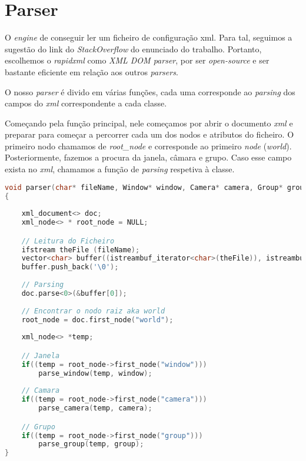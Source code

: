 \documentclass[14pt, a4 paper]{report}
\begin{document}
\section{Parser}
O \textit{engine} de conseguir ler um ficheiro de configuração xml. Para tal, seguimos a sugestão do link do \textit{StackOverflow} do enunciado do trabalho. Portanto, escolhemos o \textit{rapidxml} como \textit{XML DOM parser}, por ser \textit{open-source} e ser bastante eficiente em relação aos outros \textit{parsers}.

O nosso \textit{parser} é divido em várias funções, cada uma corresponde ao \textit{parsing} dos campos do \textit{xml} correspondente a cada classe.

Começando pela função principal, nele começamos por abrir o documento \textit{xml} e preparar para começar a percorrer cada um dos nodos e atributos do ficheiro. O primeiro nodo chamamos de \textit{root\_node} e corresponde ao primeiro \textit{node} (\textit{world}).
Posteriormente, fazemos a procura da janela, câmara e grupo. Caso esse campo exista no \textit{xml}, chamamos a função de \textit{parsing} respetiva à classe.
\begin{lstlisting}[language = c++]
void parser(char* fileName, Window* window, Camera* camera, Group* group)
{  
    
    xml_document<> doc;
    xml_node<> * root_node = NULL;

    // Leitura do Ficheiro
    ifstream theFile (fileName);
    vector<char> buffer((istreambuf_iterator<char>(theFile)), istreambuf_iterator<char>());
    buffer.push_back('\0');
   
    // Parsing
    doc.parse<0>(&buffer[0]);
   
    // Encontrar o nodo raiz aka world
    root_node = doc.first_node("world");
    
    xml_node<> *temp;

    // Janela
    if((temp = root_node->first_node("window")))
        parse_window(temp, window);
    
    // Camara
    if((temp = root_node->first_node("camera")))
        parse_camera(temp, camera);

    // Grupo
    if((temp = root_node->first_node("group")))
        parse_group(temp, group);
}
\end{lstlisting}
\end{document}
